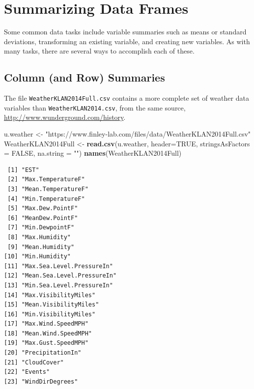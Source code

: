 \documentclass[
]{krantz}
\makeatletter
\newenvironment{Shaded}{\begin{snugshade}}{\end{snugshade}}
\newcommand{\DataTypeTok}[1]{\textcolor[rgb]{0.27,0.27,0.27}{#1}}
\newcommand{\KeywordTok}[1]{\textcolor[rgb]{0.27,0.27,0.27}{\textbf{#1}}}
\newcommand{\NormalTok}[1]{#1}
\newcommand{\OtherTok}[1]{\textcolor[rgb]{0.37,0.37,0.37}{#1}}
\newcommand{\StringTok}[1]{\textcolor[rgb]{0.5,0.5,0.5}{#1}}
\newenvironment{kframe}{%
\medskip{}
\setlength{\fboxsep}{.8em}
 \def\at@end@of@kframe{}%
 \ifinner\ifhmode%
  \def\at@end@of@kframe{\end{minipage}}%
  \begin{minipage}{\columnwidth}%
 \fi\fi%
 \def\FrameCommand##1{\hskip\@totalleftmargin \hskip-\fboxsep
 \colorbox{shadecolor}{##1}\hskip-\fboxsep
     \hskip-\linewidth \hskip-\@totalleftmargin \hskip\columnwidth}%
 \MakeFramed {\advance\hsize-\width
   \@totalleftmargin\z@ \linewidth\hsize
   \@setminipage}}%
 {\par\unskip\endMakeFramed%
 \at@end@of@kframe}
\renewenvironment{Shaded}{\begin{kframe}}{\end{kframe}}
\makeatother
\begin{document}
\hypertarget{summarizing-data-frames}{%
\section{Summarizing Data Frames}\label{summarizing-data-frames}}

Some common data tasks include variable summaries such as means or standard deviations, transforming an existing variable, and creating new variables. As with many tasks, there are several ways to accomplish each of these.

\hypertarget{column-and-row-summaries}{%
\subsection{Column (and Row) Summaries}\label{column-and-row-summaries}}

The file \texttt{WeatherKLAN2014Full.csv} contains a more complete set of weather data variables than \texttt{WeatherKLAN2014.csv}, from the same source, \url{http://www.wunderground.com/history}.

\begin{Shaded}
\begin{Highlighting}[]
\NormalTok{u.weather \textless{}{-}}\StringTok{ "https://www.finley{-}lab.com/files/data/WeatherKLAN2014Full.csv"}
\NormalTok{WeatherKLAN2014Full \textless{}{-}}\StringTok{ }\KeywordTok{read.csv}\NormalTok{(u.weather, }\DataTypeTok{header=}\OtherTok{TRUE}\NormalTok{, }
                               \DataTypeTok{stringsAsFactors =} \OtherTok{FALSE}\NormalTok{, }
                               \DataTypeTok{na.string =} \StringTok{""}\NormalTok{)}
\KeywordTok{names}\NormalTok{(WeatherKLAN2014Full)}
\end{Highlighting}
\end{Shaded}

\begin{verbatim}
 [1] "EST"                      
 [2] "Max.TemperatureF"         
 [3] "Mean.TemperatureF"        
 [4] "Min.TemperatureF"         
 [5] "Max.Dew.PointF"           
 [6] "MeanDew.PointF"           
 [7] "Min.DewpointF"            
 [8] "Max.Humidity"             
 [9] "Mean.Humidity"            
[10] "Min.Humidity"             
[11] "Max.Sea.Level.PressureIn" 
[12] "Mean.Sea.Level.PressureIn"
[13] "Min.Sea.Level.PressureIn" 
[14] "Max.VisibilityMiles"      
[15] "Mean.VisibilityMiles"     
[16] "Min.VisibilityMiles"      
[17] "Max.Wind.SpeedMPH"        
[18] "Mean.Wind.SpeedMPH"       
[19] "Max.Gust.SpeedMPH"        
[20] "PrecipitationIn"          
[21] "CloudCover"               
[22] "Events"                   
[23] "WindDirDegrees"           
\end{verbatim}
\end{document}
